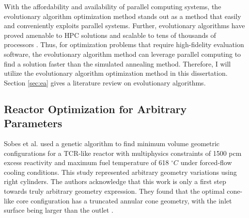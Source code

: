 With the affordability and availability of parallel computing systems, the 
evolutionary algorithm optimization method stands out as a method 
that easily and conveniently exploits parallel systems. 
Further, evolutionary algorithms have proved amenable to \gls{HPC} solutions and 
scalable to tens of thousands of processors \cite{kropaczek_constraint_2019}. 
Thus, for optimization problems that require high-fidelity evaluation software, 
the evolutionary algorithm method can leverage parallel computing to find a 
solution faster than the simulated annealing method.
Therefore, I will utilize the evolutionary algorithm optimization method in 
this dissertation.
Section \ref{sec:ea} gives a literature review on evolutionary algorithms.

\subsection{Reactor Optimization for Arbitrary Parameters}
\label{sec:lit-review-reactor-arbitrary}
Sobes et al. \cite{sobes_artificial_2020} used a genetic algorithm to find 
minimum volume geometric configurations for a \gls{TCR}-like reactor with 
multiphysics constraints of 1500 pcm excess reactivity and maximum fuel 
temperature of 618 $^{\circ}C$ under forced-flow cooling conditions. 
This study represented arbitrary geometry variations using right cylinders.
The authors acknowledge that this work is only a first step towards truly 
arbitrary geometry expression. 
They found that the optimal cone-like core configuration has a truncated annular 
cone geometry, with the inlet surface being larger than the outlet 
\cite{sobes_artificial_2020}.

